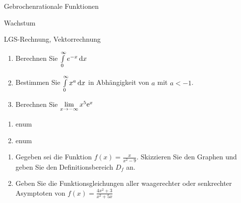 


\begin{inhalt}
  \item Gebrochenrationale Funktionen
	\item Wachstum
	\item LGS-Rechnung, Vektorrechnung
\end{inhalt}

\begin{enumerate}
	\item Berechnen Sie $\int\limits^\infty_0 e^{-x}\,\mathrm{d} x$
	\item	Bestimmen Sie $\int\limits^\infty_0 x^a\,\mathrm{d} x$ in Abhängigkeit von $a$ mit $a < -1$.
	\item Berechnen Sie $\lim\limits_{x\rightarrow -\infty} x^5\mathrm{e}^x$
\end{enumerate}

\begin{enumerate}
	\item enum
	\item	enum
\end{enumerate}

\begin{enumerate}
	\item Gegeben sei die Funktion $f(x)=\frac{x}{x^2-9}$. Skizzieren Sie den Graphen und geben Sie den Definitionsbereich $D_f$ an.
	\item	Geben Sie die Funktionsgleichungen aller waagerechter oder senkrechter Asymptoten von $f(x)=\frac{4x^2+3}{x^2+5x}$
\end{enumerate}

